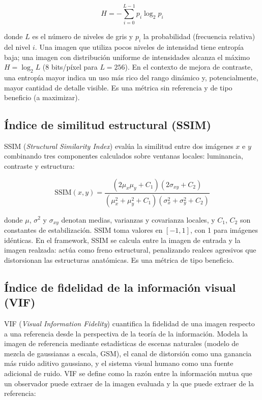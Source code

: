\begin{equation}
H = -\sum_{i=0}^{L-1} p_i \log_2 p_i
\label{eq:entropia}
\end{equation}

donde $L$ es el número de niveles de gris y $p_i$ la probabilidad (frecuencia relativa) del nivel $i$. Una imagen que utiliza pocos niveles de intensidad tiene entropía baja; una imagen con distribución uniforme de intensidades alcanza el máximo $H = \log_2 L$ (8 bits/píxel para $L = 256$). En el contexto de mejora de contraste, una entropía mayor indica un uso más rico del rango dinámico y, potencialmente, mayor cantidad de detalle visible. Es una métrica sin referencia y de tipo beneficio (a maximizar).

\subsection{Índice de similitud estructural (SSIM)}

SSIM (\textit{Structural Similarity Index}) \citep{Wang2004} evalúa la similitud entre dos imágenes $x$ e $y$ combinando tres componentes calculados sobre ventanas locales: luminancia, contraste y estructura:

\begin{equation}
\text{SSIM}(x, y) = \frac{(2\mu_x\mu_y + C_1)(2\sigma_{xy} + C_2)}{(\mu_x^2 + \mu_y^2 + C_1)(\sigma_x^2 + \sigma_y^2 + C_2)}
\label{eq:ssim}
\end{equation}

donde $\mu$, $\sigma^2$ y $\sigma_{xy}$ denotan medias, varianzas y covarianza locales, y $C_1$, $C_2$ son constantes de estabilización. SSIM toma valores en $[-1, 1]$, con 1 para imágenes idénticas. En el framework, SSIM se calcula entre la imagen de entrada y la imagen realzada: actúa como freno estructural, penalizando realces agresivos que distorsionan las estructuras anatómicas. Es una métrica de tipo beneficio.

\subsection{Índice de fidelidad de la información visual (VIF)}

VIF (\textit{Visual Information Fidelity}) \citep{Sheikh2006} cuantifica la fidelidad de una imagen respecto a una referencia desde la perspectiva de la teoría de la información. Modela la imagen de referencia mediante estadísticas de escenas naturales (modelo de mezcla de gaussianas a escala, GSM), el canal de distorsión como una ganancia más ruido aditivo gaussiano, y el sistema visual humano como una fuente adicional de ruido. VIF se define como la razón entre la información mutua que un observador puede extraer de la imagen evaluada y la que puede extraer de la referencia:

